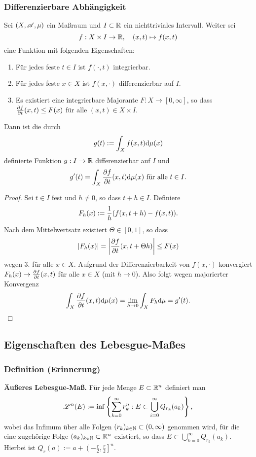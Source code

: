 \subsubsection{Differenzierbare Abhängigkeit}
\begin{thm}
 Sei $(X, \mathscr{A}, \mu)$ ein Maßraum und $I \subset \mathbb{R}$ ein nichttriviales Intervall. Weiter sei 
 \[ f: X \times I \to \mathbb{R}, \quad (x,t) \mapsto f(x,t) \]
 eine Funktion mit folgenden Eigenschaften:
 \begin{enumerate}
  \item Für jedes feste $t \in I$ ist $f( \cdot, t )$ integrierbar.
  \item Für jedes feste $x \in X$ ist $f( x, \cdot )$ differenzierbar auf $I$.
  \item Es existiert eine integrierbare Majorante $F: X \to [0,\infty]$, so dass $\frac{\partial f}{\partial t}(x,t) \le F(x)$ für alle $(x,t) \in X \times I$.
 \end{enumerate}
 Dann ist die durch
 \[ g(t) := \int_X f(x,t) \mathrm{d} \mu(x)  \]
 definierte Funktion $g: I \to \mathbb{R}$ differenzierbar auf $I$ und
 \[ g'(t) = \int_X \frac{\partial f}{\partial t}(x,t) \mathrm{d} \mu(x) \text{ für alle } t \in I. \]
\end{thm}

\begin{proof}
 Sei $t \in I$ fest und $h \ne 0$, so dass $t+h \in I$. Definiere
 \[ F_h(x) := \frac{1}{h}( f(x, t+h) - f(x,t) ). \]
 Nach dem Mittelwertsatz existiert $\Theta \in [0,1]$, so dass
 \[ |F_h(x)| = \left| \frac{\partial f}{\partial t} (x, t + \Theta h) \right| \le F(x) \]
 wegen 3. für alle $x \in X$. Aufgrund der Differenzierbarkeit von $f(x, \cdot)$ konvergiert $F_h(x) \to \frac{\partial f}{\partial t}(x,t)$ für alle $x \in X$ (mit $h \to 0$). Also folgt wegen majorierter Konvergenz
 \[ \int_X \frac{\partial f}{\partial t}(x,t) \mathrm{d} \mu(x) = \lim_{h \to 0} \int_X F_h \mathrm{d} \mu = g'(t). \qedhere \]
\end{proof}

\clearpage

\subsection{Eigenschaften des Lebesgue-Maßes}
\subsubsection{Definition (Erinnerung)}
 \textbf{Äußeres Lebesgue-Maß.} Für jede Menge $E \subset \mathbb{R}^n$ definiert man
 \[ \mathscr{L}^n( E ) := \inf \left\{ \sum_{k=0}^\infty r_k^n : E \subset \bigcup_{i=0}^\infty Q_{r_k}(a_k) \right\}, \]
 wobei das Infimum über alle Folgen $(r_k)_{k \in \mathbb{N}} \subset (0, \infty)$ genommen wird, für die eine zugehörige Folge $(a_k)_{k \in \mathbb{N}} \subset \mathbb{R}^n$ existiert, so dass $E \subset \bigcup_{k=0}^\infty Q_{r_k}(a_k)$. Hierbei ist $Q_{r}(a) := a + \left(-\frac{r}{2}, \frac{r}{2} \right]^n$.

